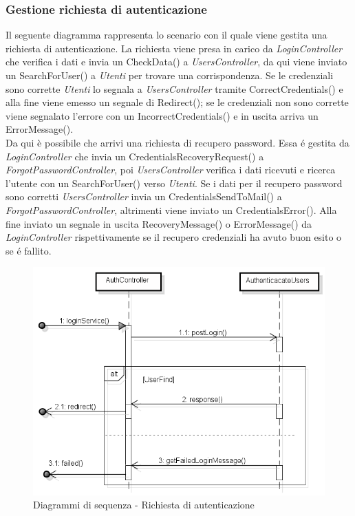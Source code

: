 \subsubsection{Gestione richiesta di autenticazione}
Il seguente diagramma rappresenta lo scenario con il quale viene gestita una richiesta di autenticazione. La richiesta viene presa in carico da \textit{LoginController} che verifica i dati e invia un CheckData() a \textit{UsersController}, da qui viene inviato un SearchForUser() a \textit{Utenti} per trovare una corrispondenza. Se le credenziali sono corrette \textit{Utenti} lo segnala a \textit{UsersController} tramite CorrectCredentials() e alla fine viene emesso un segnale di Redirect(); se le credenziali non sono corrette viene segnalato l'errore con un IncorrectCredentials() e in uscita arriva un ErrorMessage().\\
Da qui è possibile che arrivi una richiesta di recupero password. Essa é gestita da \textit{LoginController} che invia un CredentialsRecoveryRequest() a \textit{ForgotPasswordController}, poi \textit{UsersController} verifica i dati ricevuti e ricerca l'utente con un SearchForUser() verso \textit{Utenti}. Se i dati per il recupero password sono corretti \textit{UsersController} invia un CredentialsSendToMail() a \textit{ForgotPasswordController}, altrimenti viene inviato un CredentialsError(). Alla fine inviato un segnale in uscita RecoveryMessage() o ErrorMessage() da \textit{LoginController} rispettivamente se il recupero credenziali ha avuto buon esito o se é fallito.

\begin{figure}[h]
	\centering
	\includegraphics[scale=0.5]{img/login.png}
	\caption{Diagrammi di sequenza - Richiesta di autenticazione}
\end{figure}


